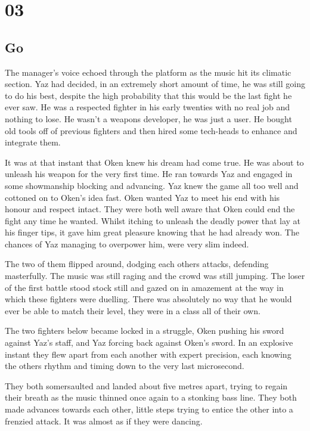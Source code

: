 \chapter{03}
\section{	Go}


The manager's voice echoed through the platform as the music hit its climatic section.  Yaz had decided, in an extremely short amount of time, he was still going to do his best, despite the high probability that this would be the last fight he ever saw.  He was a respected fighter in his early twenties with no real job and nothing to lose.  He wasn't a weapons developer, he was just a user.  He bought old tools off of previous fighters and then hired some tech-heads to enhance and integrate them.

It was at that instant that Oken knew his dream had come true.  He was about to unleash his weapon for the very first time.  He ran towards Yaz and engaged in some showmanship blocking and advancing.  Yaz knew the game all too well and cottoned on to Oken's idea fast.  Oken wanted Yaz to meet his end with his honour and respect intact.  They were both well aware that Oken could end the fight any time he wanted.  Whilst itching to unleash the deadly power that lay at his finger tips, it gave him great pleasure knowing that he had already won.  The chances of Yaz managing to overpower him, were very slim indeed.

The two of them flipped around, dodging each others attacks, defending masterfully.  The music was still raging and the crowd was still jumping.  The loser of the first battle stood stock still and gazed on in amazement at the way in which these fighters were duelling.  There was absolutely no way that he would ever be able to match their level, they were in a class all of their own.  

The two fighters below became locked in a struggle,  Oken pushing his sword against Yaz's staff, and Yaz forcing back against Oken's sword.  In an explosive instant they flew apart from each another with expert precision, each knowing the others rhythm and timing down to the very last microsecond.  

They both somersaulted and landed about five metres apart, trying to regain their breath as the music thinned once again to a stonking bass line.  They both made advances towards each other, little steps trying to entice the other into a frenzied attack.  It was almost as if they were dancing.  

